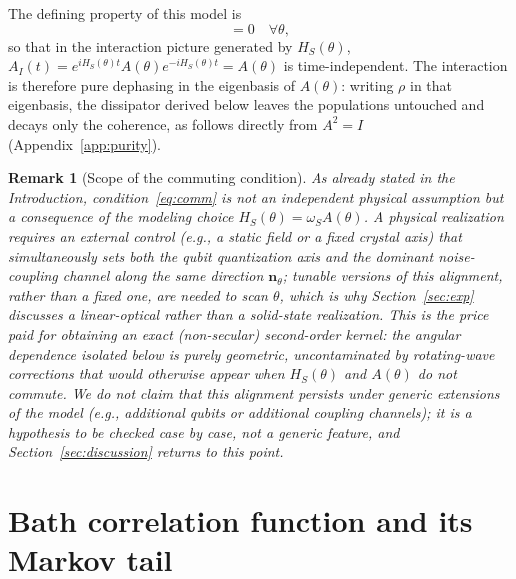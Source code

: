 \documentclass[aps,pra,reprint,superscriptaddress,nofootinbib,longbibliography]{revtex4-2}
\newtheorem{remark}[theorem]{Remark}
\begin{document}
The defining property of this model is
\begin{equation}
[H_S(\theta),A(\theta)]=0 \quad \forall\theta,
\label{eq:comm}
\end{equation}
so that in the interaction picture generated by $H_S(\theta)$,
$A_I(t)=e^{iH_S(\theta)t}A(\theta)e^{-iH_S(\theta)t}=A(\theta)$ is
time-independent. The interaction is therefore pure dephasing in the
eigenbasis of $A(\theta)$: writing $\rho$ in that eigenbasis, the
dissipator derived below leaves the populations untouched and decays
only the coherence, as follows directly from $A^2=I$ (Appendix~\ref{app:purity}).

\begin{remark}[Scope of the commuting condition]
\label{rem:HS_choice}
As already stated in the Introduction, condition~\eqref{eq:comm} is
not an independent physical assumption but a consequence of the
modeling choice $H_S(\theta)=\omega_S A(\theta)$. A physical
realization requires an external control (e.g., a static field or a
fixed crystal axis) that simultaneously sets both the qubit
quantization axis and the dominant noise-coupling channel along the
same direction $\mathbf n_\theta$; tunable versions of this alignment,
rather than a fixed one, are needed to scan $\theta$, which is why
Section~\ref{sec:exp} discusses a linear-optical rather than a
solid-state realization. This is the price paid for obtaining an
exact (non-secular) second-order kernel: the angular dependence
isolated below is purely geometric, uncontaminated by rotating-wave
corrections that would otherwise appear when $H_S(\theta)$ and
$A(\theta)$ do not commute. We do not claim that this alignment
persists under generic extensions of the model (e.g., additional
qubits or additional coupling channels); it is a hypothesis to be
checked case by case, not a generic feature, and
Section~\ref{sec:discussion} returns to this point.
\end{remark}

\section{Bath correlation function and its Markov tail}
\label{sec:bath}
\end{document}
